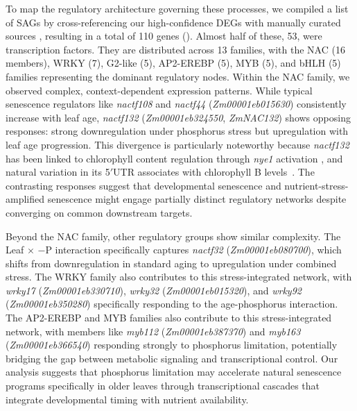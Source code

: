 \documentclass[9pt,twocolumn,twoside]{rilabRxiv}
\begin{document}
To map the regulatory architecture governing these processes, we compiled a list of SAGs by cross-referencing our high-confidence DEGs with manually curated sources \cite{zhang2014c,liu2011,ojeda2026,berardini2015,durinck2005}, resulting in a total of 110 genes (). 
Almost half of these, 53, were transcription factors. 
They are distributed across 13 families, with the NAC (16 members), WRKY (7), G2-like (5), AP2-EREBP (5), MYB (5), and bHLH (5) families representing the dominant regulatory nodes. 
Within the NAC family, we observed complex, context-dependent expression patterns. 
While typical senescence regulators like \textit{nactf108} and \textit{nactf44} (\textit{Zm00001eb015630}) consistently increase with leaf age, \textit{nactf132} (\textit{Zm00001eb324550}, \textit{ZmNAC132}) shows opposing responses: strong downregulation under phosphorus stress but upregulation with leaf age progression. 
This divergence is particularly noteworthy because \textit{nactf132} has been linked to chlorophyll content regulation through \textit{nye1} activation \cite{yuan2023}, and natural variation in its 5$'$UTR associates with chlorophyll B levels~\cite{wallace2014a}. 
The contrasting responses suggest that developmental senescence and nutrient-stress-amplified senescence might engage partially distinct regulatory networks despite converging on common downstream targets.

Beyond the NAC family, other regulatory groups show similar complexity. 
The Leaf $\times$ $-$P interaction specifically captures \textit{nactf32} (\textit{Zm00001eb080700}), which shifts from downregulation in standard aging to upregulation under combined stress. 
The WRKY family also contributes to this stress-integrated network, with \textit{wrky17} (\textit{Zm00001eb330710}), \textit{wrky32} (\textit{Zm00001eb015320}), and \textit{wrky92} (\textit{Zm00001eb350280}) specifically responding to the age-phosphorus interaction. 
The AP2-EREBP and MYB families also contribute to this stress-integrated network, with members like \textit{myb112} (\textit{Zm00001eb387370}) and \textit{myb163} (\textit{Zm00001eb366540}) responding strongly to phosphorus limitation, potentially bridging the gap between metabolic signaling and transcriptional control.
Our analysis suggests that phosphorus limitation may accelerate natural senescence programs specifically in older leaves through transcriptional cascades that integrate developmental timing with nutrient availability.
\end{document}
